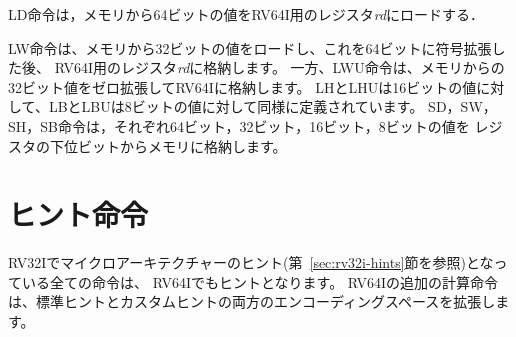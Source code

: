 \begin{comment}
The LD instruction loads a 64-bit value from memory into register {\em
  rd} for RV64I.
\end{comment}

LD命令は，メモリから64ビットの値をRV64I用のレジスタ{\em rd}にロードする．

\begin{comment}
The LW instruction loads a 32-bit value from memory and sign-extends
this to 64 bits before storing it in register {\em rd} for RV64I.  The
LWU instruction, on the other hand, zero-extends the 32-bit value from
memory for RV64I.  LH and LHU are defined analogously for 16-bit
values, as are LB and LBU for 8-bit values.  The SD, SW, SH, and SB
instructions store 64-bit, 32-bit, 16-bit, and 8-bit values from the
low bits of register {\em rs2} to memory respectively.
\end{comment}

LW命令は、メモリから32ビットの値をロードし、これを64ビットに符号拡張した後、
RV64I用のレジスタ{\em rd}に格納します。
一方、LWU命令は、メモリからの32ビット値をゼロ拡張してRV64Iに格納します。
LHとLHUは16ビットの値に対して、LBとLBUは8ビットの値に対して同様に定義されています。
SD，SW，SH，SB命令は，それぞれ64ビット，32ビット，16ビット，8ビットの値を
レジスタの下位ビットからメモリに格納します。

\begin{comment}
\section{HINT Instructions}
\end{comment}
\section{ヒント命令}
\label{sec:rv64i-hints}

\begin{comment}
All instructions that are microarchitectural HINTs in RV32I (see
Section~\ref{sec:rv32i-hints}) are also HINTs in RV64I.  The
additional computational instructions in RV64I expand both the standard and
custom HINT encoding spaces.
\end{comment}

RV32Iでマイクロアーキテクチャーのヒント(第~\ref{sec:rv32i-hints}節を参照)となっている全ての命令は、
RV64Iでもヒントとなります。
RV64Iの追加の計算命令は、標準ヒントとカスタムヒントの両方のエンコーディングスペースを拡張します。

